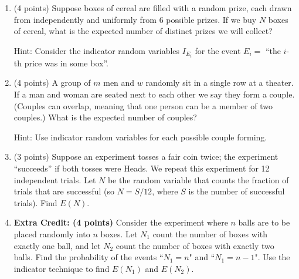 \documentclass[11pt]{article}
\begin{document}
\begin{enumerate}
\item (4 points) Suppose boxes of cereal are filled with a random prize,
each drawn from independently and uniformly from $6$ possible prizes.
If we buy $N$ boxes of cereal, what is the expected number of distinct
prizes we will collect? \begin{small}\textsf{Hint: Consider the indicator
random variables $I_{E_i}$ for the event $E_i =$ ``the $i$-th price was
in some box''.}\end{small}

\item (4 points) A group of $m$ men and $w$ randomly sit in a single row at a
theater.  If a man and woman are seated next to each other we say they form a
couple.  (Couples can overlap, meaning that one person can be a member of two
couples.)  What is the expected number of couples?
\begin{small}\textsf{Hint: Use indicator
random variables for each possible couple forming.
}\end{small}

\item (3 points) Suppose an experiment tosses a fair coin twice;  the experiment
``succeeds'' if both tosses were Heads.  We repeat this experiment 
for 12 independent trials.  Let $N$ be the random variable that counts
the fraction of trials that are successful (so $N = S/12$, where
$S$ is the number of successful trials).  Find $E(N)$.

\item \textbf{Extra Credit: (4 points)} Consider the experiment where $n$ balls
are to be placed randomly into $n$ boxes. Let $N_1$ count the number of boxes
with exactly one ball, and let $N_2$ count the number of boxes with exactly two
balls. Find the probability of the events ``$N_1 = n$" and ``$N_1 = n - 1$".
Use the indicator technique to find $E(N_1)$ and $E(N_2)$.


\end{enumerate}
\end{document}
